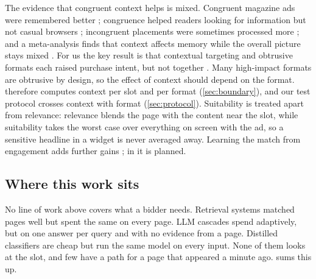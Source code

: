 The evidence that congruent context helps is mixed. Congruent magazine ads were remembered better \citep{moorman2002effects}; congruence helped readers looking for information but not casual browsers \citep{zanjani2011does}; incongruent placements were sometimes processed more \citep{dahlen2008could}; and a meta-analysis finds that context affects memory while the overall picture stays mixed \citep{kwon2019impact}. For us the key result is that contextual targeting and obtrusive formats each raised purchase intent, but not together \citep{goldfarb2011online}. Many high-impact formats are obtrusive by design, so the effect of context should depend on the format. \sys{} therefore computes context per slot and per format (\cref{sec:boundary}), and our test protocol crosses context with format (\cref{sec:protocol}). Suitability is treated apart from relevance: relevance blends the page with the content near the slot, while suitability takes the worst case over everything on screen with the ad, so a sensitive headline in a widget is never averaged away. Learning the match from engagement adds further gains \citep{chakrabarti2008contextual,li2010contextual}; in \sys{} it is planned.

\subsection{Where this work sits}\label{sec:related-position}

No line of work above covers what a bidder needs. Retrieval systems matched pages well but spent the same on every page. LLM cascades spend adaptively, but on one answer per query and with no evidence from a page. Distilled classifiers are cheap but run the same model on every input. None of them looks at the slot, and few have a path for a page that appeared a minute ago.  sums this up.

\DeclareRobustCommand{\relyes}{\tikz[baseline=-0.6ex]\fill[ink] (0,0) circle (0.95mm);}
\DeclareRobustCommand{\relpart}{\tikz[baseline=-0.6ex]{\fill[ink] (0,-0.95mm) arc (-90:90:0.95mm) -- cycle; \draw[ink,line width=0.45pt] (0,0) circle (0.95mm);}}
\DeclareRobustCommand{\relno}{\tikz[baseline=-0.6ex]\draw[ink,line width=0.45pt] (0,0) circle (0.95mm);}
\DeclareRobustCommand{\relna}{\textcolor{ink!45}{--}}

